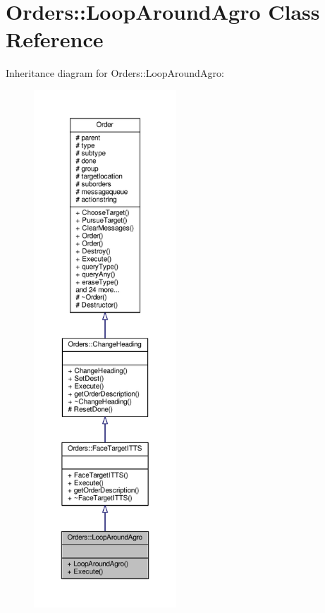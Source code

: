 \hypertarget{classOrders_1_1LoopAroundAgro}{}\section{Orders\+:\+:Loop\+Around\+Agro Class Reference}
\label{classOrders_1_1LoopAroundAgro}


Inheritance diagram for Orders\+:\+:Loop\+Around\+Agro\+:
\nopagebreak
\begin{figure}[H]
\begin{center}
\leavevmode
\includegraphics[height=550pt]{d7/dd5/classOrders_1_1LoopAroundAgro__inherit__graph}
\end{center}
\end{figure}


